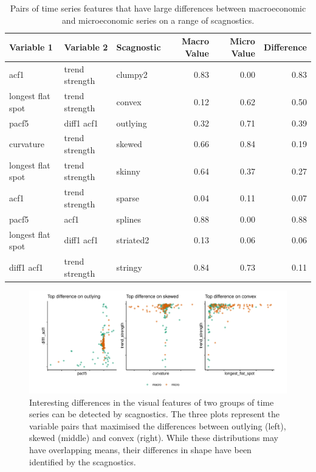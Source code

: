 \begin{Schunk}
\begin{table}

\caption{\label{tab:scagsmacmic-pdf}Pairs of time series features that have large differences between macroeconomic and microeconomic series on a range of scagnostics.}
\centering
\begin{tabular}[t]{lllrrr}
\toprule
Variable 1 & Variable 2 & Scagnostic & Macro Value & Micro Value & Difference\\
\midrule
acf1 & trend strength & clumpy2 & 0.83 & 0.00 & 0.83\\
longest flat spot & trend strength & convex & 0.12 & 0.62 & 0.50\\
pacf5 & diff1 acf1 & outlying & 0.32 & 0.71 & 0.39\\
curvature & trend strength & skewed & 0.66 & 0.84 & 0.19\\
longest flat spot & trend strength & skinny & 0.64 & 0.37 & 0.27\\
\addlinespace
acf1 & trend strength & sparse & 0.04 & 0.11 & 0.07\\
pacf5 & acf1 & splines & 0.88 & 0.00 & 0.88\\
longest flat spot & diff1 acf1 & striated2 & 0.13 & 0.06 & 0.06\\
diff1 acf1 & trend strength & stringy & 0.84 & 0.73 & 0.11\\
\bottomrule
\end{tabular}
\end{table}

\end{Schunk}

\begin{Schunk}
\begin{figure}
\includegraphics[width=1\linewidth]{mason-lee-laa-cook_files/figure-latex/timeseries-1} \caption[Interesting differences in the visual features of two groups of time series can be detected by scagnostics]{Interesting differences in the visual features of two groups of time series can be detected by scagnostics. The three plots represent the variable pairs that maximised the differences between outlying (left), skewed (middle) and convex (right). While these distributions may have overlapping means, their differencs in shape have been identified by the scagnostics.}\label{fig:timeseries}
\end{figure}
\end{Schunk}

